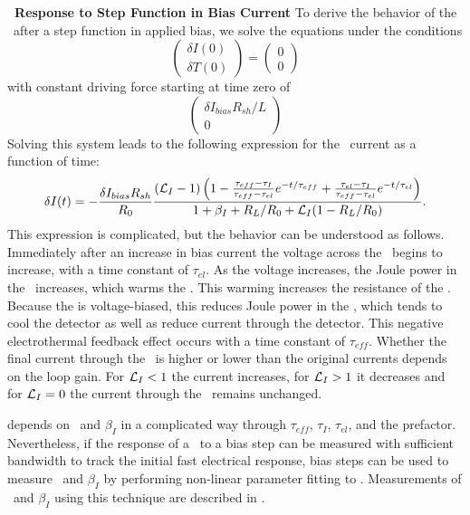 \textbf{\TES\ Response to Step Function in Bias Current}
To derive the behavior of the \TES\ after a step function in applied bias, we solve the equations under the conditions
\begin{equation}
\begin{pmatrix} \delta I(0) \\ \delta T(0) \end{pmatrix} = \begin{pmatrix} 0 \\ 0 \end{pmatrix}
\end{equation}
with constant driving force starting at time zero of
\begin{equation}
\begin{pmatrix} \delta I_{bias} R_{sh} / L \\ 0 \end{pmatrix}
\end{equation}
Solving this system leads to the following expression for the \TES\ current as a function of time:
\begin{equation}\label{eqn:bias-step-resp}
\delta I (t)
   = - \frac{\delta I_{bias} R_{sh}}{R_0} 
       \frac{(\mathcal{L}_I - 1)
             \left(1 - \frac{\tau_{eff} - \tau_I}{\tau_{eff} - \tau_{el}} e^{-t/\tau_{eff}}
                 	       + \frac{\tau_{el} - \tau_I}{\tau_{eff} - \tau_{el}} e^{-t/\tau_{el}} \right)}
            {1 + \beta_I + R_L/R_0 + \mathcal{L}_I(1 - R_L/R_0)}
       .
\end{equation}
This expression is complicated, but the behavior can be understood as follows.
Immediately after an increase in bias current the voltage across the \TES\ begins to increase, with a time constant of $\tau_{el}$.
As the voltage increases, the Joule power in the \TES\ increases, which warms the \TES.
This warming increases the resistance of the \TES.
Because the \TES is voltage-biased, this reduces Joule power in the \TES, which tends to cool the detector as well as reduce current through the detector.
This negative electrothermal feedback effect occurs with a time constant of $\tau_{eff}$.
Whether the final current through the \TES\ is higher or lower than the original currents depends on the loop gain.
For $\mathcal{L}_I < 1$ the current increases, for $\mathcal{L}_I > 1$ it decreases and for $\mathcal{L}_I = 0$ the current through the \TES\ remains unchanged.

 depends on \Loop\ and $\beta_I$ in a complicated way through $\tau_{eff}$, $\tau_I$, $\tau_{el}$, and the prefactor.
Nevertheless, if the response of a \TES\ to a bias step can be measured with sufficient bandwidth to track the initial fast electrical response, bias steps can be used to measure \Loop\ and $\beta_I$ by performing non-linear parameter fitting to .
Measurements of \Loop\ and $\beta_I$ using this technique are described in .

